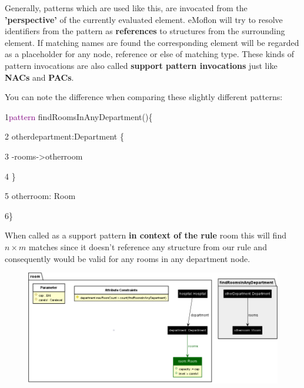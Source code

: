 Generally, patterns which are used like this, are invocated from the \textbf{'perspective'} of the currently evaluated element. eMoflon will try to resolve identifiers from the pattern as \textbf{references} to structures from the surrounding element. If matching names are found the corresponding element will be regarded as a placeholder for any node, reference or else of matching type. These kinds of pattern invocations are also called \textbf{support pattern invocations} just like \textbf{NACs} and \textbf{PACs}.\newline

You can note the difference when comparing these slightly different patterns:\newline

{

1\hspace{1cm}\textcolor{Purple}{pattern} findRoomsInAnyDepartment()\{  

2\hspace{1.5cm} otherdepartment:Department \{  

3\hspace{2cm} -rooms->otherroom 

4\hspace{1.5cm} \} 

5\hspace{1.5cm} otherroom: Room 

6\hspace{1cm}\}\newline 

}

When called as a support pattern \textbf{in context of the rule} \textsf{room} this will find $n \times m$ matches since it doesn't reference any structure from our rule and consequently would be valid for any rooms in any department node.\newline

\begin{figure}[h]
    \centering
    \includegraphics[scale=0.45]{pictures/findRoomsInAnyDepartment.png}
    \caption{}
    \label{findRoomsAny}
\end{figure}

